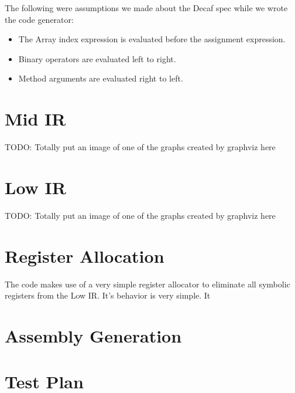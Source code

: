 \documentclass[11pt]{article}
\begin{document}
The following were assumptions we made about the Decaf spec while we
wrote the code generator: 

\begin{itemize}
\item The Array index expression is evaluated before the assignment expression. 
\item Binary operators are evaluated left to right. 
\item Method arguments are evaluated right to left. 
\end{itemize}

\section {Mid IR}
\label{sec:midir}

TODO: Totally put an image of one of the graphs created by graphviz here 

\section {Low IR} 
\label{sec:lowir}

TODO: Totally put an image of one of the graphs created by graphviz here 

\section {Register Allocation} 
\label{sec:regalloc}

The code makes use of a very simple register allocator to eliminate
all symbolic registers from the Low IR. It's behavior is very
simple. It 

\section {Assembly Generation}  
\label{sec:assembly}

\section {Test Plan}
\end{document}
